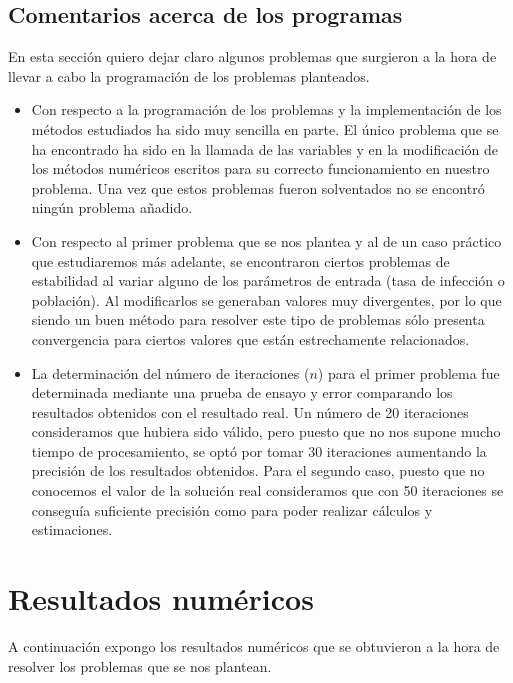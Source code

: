 \documentclass[a4paper,11pt]{article}
\numberwithin{equation}{section}
\begin{document}
\subsection{Comentarios acerca de los programas}
\indent En esta sección quiero dejar claro algunos problemas que surgieron a la hora de llevar a cabo la programación de los problemas planteados.
\begin{itemize}
	\item Con respecto a la programación de los problemas y la implementación de los métodos estudiados ha sido muy sencilla en parte. El único problema que se ha encontrado ha sido en la llamada de las variables y en la modificación de los métodos numéricos escritos para su correcto funcionamiento en nuestro problema. Una vez que estos problemas fueron solventados no se encontró ningún problema añadido.
	\item Con respecto al primer problema que se nos plantea y al de un caso práctico que estudiaremos más adelante, se encontraron ciertos problemas de estabilidad al variar alguno de los parámetros de entrada (tasa de infección o población). Al modificarlos se generaban valores muy divergentes, por lo que siendo un buen método para resolver este tipo de problemas sólo presenta convergencia para ciertos valores que están estrechamente relacionados. 
	\item La determinación del número de iteraciones ($ n $) para el primer problema fue determinada mediante una prueba de ensayo y error comparando los resultados obtenidos con el resultado real. Un número de 20 iteraciones consideramos que hubiera sido válido, pero puesto que no nos supone mucho tiempo de procesamiento, se optó por tomar 30 iteraciones aumentando la precisión de los resultados obtenidos. Para el segundo caso, puesto que no conocemos el valor de la solución real consideramos que con 50 iteraciones se conseguía suficiente precisión como para poder realizar cálculos y estimaciones.
\end{itemize}

\newpage
\section{Resultados numéricos}
\indent A continuación expongo los resultados numéricos que se obtuvieron a la hora de resolver los problemas que se nos plantean.
\end{document}
